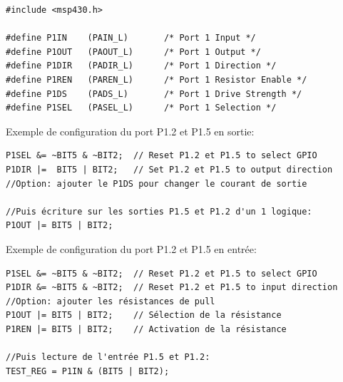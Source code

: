 \lstset{style=customc}
\begin{lstlisting}
#include <msp430.h>

#define P1IN   	(PAIN_L)       /* Port 1 Input */
#define P1OUT 	(PAOUT_L)      /* Port 1 Output */
#define P1DIR	(PADIR_L)      /* Port 1 Direction */
#define P1REN	(PAREN_L)      /* Port 1 Resistor Enable */
#define P1DS 	(PADS_L)       /* Port 1 Drive Strength */
#define P1SEL	(PASEL_L)      /* Port 1 Selection */
\end{lstlisting}

Exemple de configuration du port P1.2 et P1.5 en sortie:

\lstset{style=customc}
\begin{lstlisting}
P1SEL &= ~BIT5 & ~BIT2;  // Reset P1.2 et P1.5 to select GPIO
P1DIR |=  BIT5 | BIT2;   // Set P1.2 et P1.5 to output direction
//Option: ajouter le P1DS pour changer le courant de sortie

//Puis écriture sur les sorties P1.5 et P1.2 d'un 1 logique:
P1OUT |= BIT5 | BIT2;
\end{lstlisting}

Exemple de configuration du port P1.2 et P1.5 en entrée:

\lstset{style=customc}
\begin{lstlisting}
P1SEL &= ~BIT5 & ~BIT2;  // Reset P1.2 et P1.5 to select GPIO
P1DIR &= ~BIT5 & ~BIT2;  // Reset P1.2 et P1.5 to input direction
//Option: ajouter les résistances de pull
P1OUT |= BIT5 | BIT2;    // Sélection de la résistance
P1REN |= BIT5 | BIT2;    // Activation de la résistance

//Puis lecture de l'entrée P1.5 et P1.2:
TEST_REG = P1IN & (BIT5 | BIT2);
\end{lstlisting}

